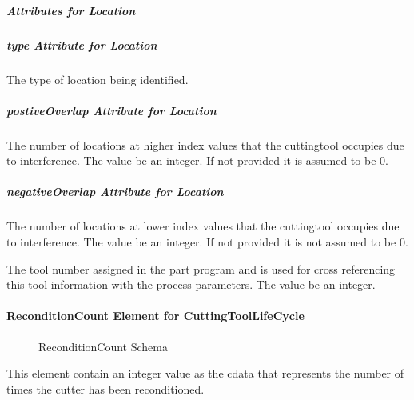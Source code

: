 \subparagraph{Attributes for Location}\mbox{}



\subparagraph{type Attribute for Location}\mbox{}

The type of location being identified.



\subparagraph{postiveOverlap Attribute for Location}\mbox{}

The number of locations at higher index values that the \gls{cuttingtool} occupies due to interference.	 The value \MUST be an integer.  If not provided it is assumed to be 0. 

\subparagraph{negativeOverlap Attribute for Location}\mbox{}

The number of locations at lower index values that the \gls{cuttingtool} occupies due to interference. The value \MUST be an integer.  If not provided it is not assumed to be 0.

The tool number assigned in the part program and is used for cross referencing this tool information with the process parameters.	 The value \MUST be an integer.

\paragraph{ReconditionCount Element for CuttingToolLifeCycle}\mbox{}

\begin{figure}[ht]
  \centering
  \caption{ReconditionCount Schema}
  \label{fig:reconditioncount-schema}
\end{figure}

\FloatBarrier

This element \MUST contain an integer value as the \gls{cdata} that represents the number of times the cutter has been reconditioned. 

